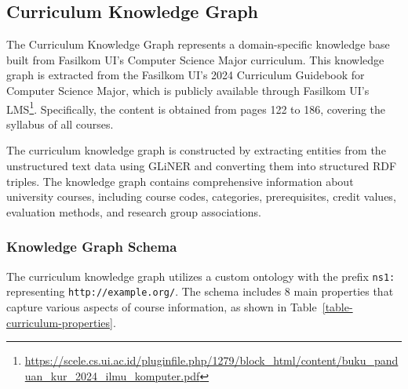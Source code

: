 \subsection{Curriculum Knowledge Graph}
\label{curriculum-kg}

The Curriculum Knowledge Graph represents a domain-specific knowledge base built from Fasilkom UI's Computer Science Major curriculum. This knowledge graph is extracted from the Fasilkom UI's 2024 Curriculum Guidebook for Computer Science Major, which is publicly available through Fasilkom UI's LMS\footnote{\url{https://scele.cs.ui.ac.id/pluginfile.php/1279/block_html/content/buku_panduan_kur_2024_ilmu_komputer.pdf}}. Specifically, the content is obtained from pages 122 to 186, covering the syllabus of all courses.

The curriculum knowledge graph is constructed by extracting entities from the unstructured text data using GLiNER \citep{zaratiana2023glinergeneralistmodelnamed} and converting them into structured RDF triples. The knowledge graph contains comprehensive information about university courses, including course codes, categories, prerequisites, credit values, evaluation methods, and research group associations.

\subsubsection{Knowledge Graph Schema}
The curriculum knowledge graph utilizes a custom ontology with the prefix \texttt{ns1:} representing \texttt{http://example.org/}. The schema includes 8 main properties that capture various aspects of course information, as shown in Table~\ref{table-curriculum-properties}.


